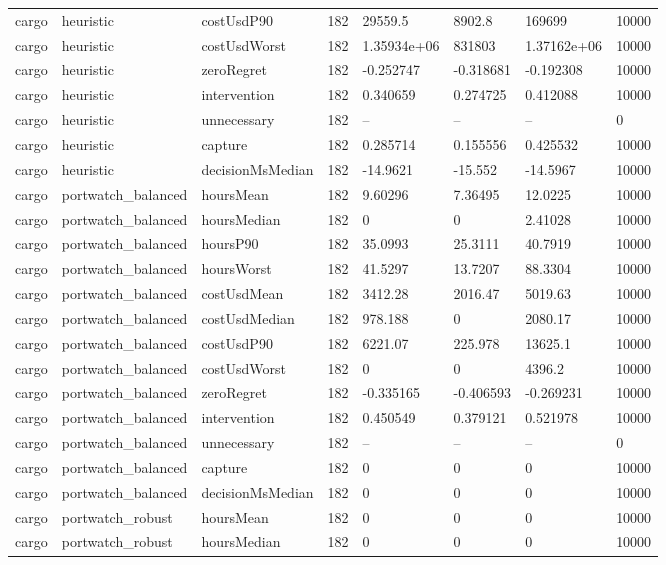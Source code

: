\begin{tabular}{llllllll}
cargo & heuristic & costUsdP90 & 182 & 29559.5 & 8902.8 & 169699 & 10000 \\
cargo & heuristic & costUsdWorst & 182 & 1.35934e+06 & 831803 & 1.37162e+06 & 10000 \\
cargo & heuristic & zeroRegret & 182 & -0.252747 & -0.318681 & -0.192308 & 10000 \\
cargo & heuristic & intervention & 182 & 0.340659 & 0.274725 & 0.412088 & 10000 \\
cargo & heuristic & unnecessary & 182 & -- & -- & -- & 0 \\
cargo & heuristic & capture & 182 & 0.285714 & 0.155556 & 0.425532 & 10000 \\
cargo & heuristic & decisionMsMedian & 182 & -14.9621 & -15.552 & -14.5967 & 10000 \\
cargo & portwatch\_balanced & hoursMean & 182 & 9.60296 & 7.36495 & 12.0225 & 10000 \\
cargo & portwatch\_balanced & hoursMedian & 182 & 0 & 0 & 2.41028 & 10000 \\
cargo & portwatch\_balanced & hoursP90 & 182 & 35.0993 & 25.3111 & 40.7919 & 10000 \\
cargo & portwatch\_balanced & hoursWorst & 182 & 41.5297 & 13.7207 & 88.3304 & 10000 \\
cargo & portwatch\_balanced & costUsdMean & 182 & 3412.28 & 2016.47 & 5019.63 & 10000 \\
cargo & portwatch\_balanced & costUsdMedian & 182 & 978.188 & 0 & 2080.17 & 10000 \\
cargo & portwatch\_balanced & costUsdP90 & 182 & 6221.07 & 225.978 & 13625.1 & 10000 \\
cargo & portwatch\_balanced & costUsdWorst & 182 & 0 & 0 & 4396.2 & 10000 \\
cargo & portwatch\_balanced & zeroRegret & 182 & -0.335165 & -0.406593 & -0.269231 & 10000 \\
cargo & portwatch\_balanced & intervention & 182 & 0.450549 & 0.379121 & 0.521978 & 10000 \\
cargo & portwatch\_balanced & unnecessary & 182 & -- & -- & -- & 0 \\
cargo & portwatch\_balanced & capture & 182 & 0 & 0 & 0 & 10000 \\
cargo & portwatch\_balanced & decisionMsMedian & 182 & 0 & 0 & 0 & 10000 \\
cargo & portwatch\_robust & hoursMean & 182 & 0 & 0 & 0 & 10000 \\
cargo & portwatch\_robust & hoursMedian & 182 & 0 & 0 & 0 & 10000 \\

\end{tabular}
